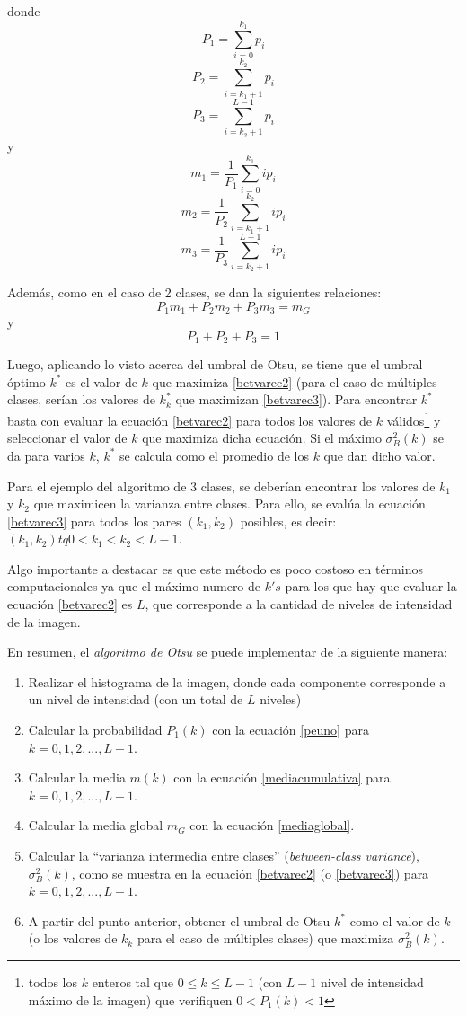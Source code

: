 donde $$P_1=\sum_{i=0}^{k_1}p_i$$ $$P_2=\sum_{i=k_1+1}^{k_2}p_i$$  $$P_3=\sum_{i=k_2+1}^{L-1}p_i$$ y $$m_1 = \frac{1}{P_1}\sum_{i=0}^{k_1}ip_i$$  $$m_2 = \frac{1}{P_2}\sum_{i=k_1+1}^{k_2}ip_i$$  $$m_3 = \frac{1}{P_3}\sum_{i=k_2+1}^{L-1}ip_i$$

Además, como en el caso de 2 clases, se dan la siguientes relaciones:
\begin{equation}
  P_1m_1 + P_2m_2 + P_3m_3 = m_G
\end{equation}
y
\begin{equation}
  P_1+P_2+P_3 = 1
\end{equation}

Luego, aplicando lo visto acerca del umbral de Otsu, se tiene que el umbral óptimo $k^*$ es el valor de $k$ que maximiza \ref{betvarec2} (para el caso de múltiples clases, serían los valores de $k_k^*$ que maximizan \ref{betvarec3}). Para encontrar $k^*$ basta con evaluar la ecuación \ref{betvarec2} para todos los valores de $k$ válidos\footnote{ todos los $k$ enteros tal que $0{\leq}k{\leq}L-1$ (con $L-1$ nivel de intensidad máximo de la imagen) que verifiquen $0<P_1(k)<1$ } y seleccionar el valor de $k$ que maximiza dicha ecuación. Si el máximo ${\sigma}_B^2(k)$ se da para varios $k$, $k^*$ se calcula como el promedio de los $k$ que dan dicho valor.

Para el ejemplo del algoritmo de 3 clases, se deberían encontrar los valores de $k_1$ y $k_2$ que maximicen la varianza entre clases. Para ello, se evalúa la ecuación \ref{betvarec3} para todos los pares $(k_1,k_2)$ posibles, es decir: $(k_1,k_2) tq 0<k_1<k_2<L-1$.

Algo importante a destacar es que este método es poco costoso en términos computacionales ya que el máximo numero de $k's$ para los que hay que evaluar la ecuación \ref{betvarec2} es $L$, que corresponde a la cantidad de niveles de intensidad de la imagen.

En resumen, el \textit{algoritmo de Otsu} se puede implementar de la siguiente manera:
\begin{enumerate}
 \item Realizar el histograma de la imagen, donde cada componente corresponde a un nivel de intensidad (con un total de $L$ niveles)
 \item Calcular la probabilidad $P_1(k)$ con la ecuación \ref{peuno} para $k=0,1,2,...,L-1$.
 \item Calcular la media $m(k)$ con la ecuación \ref{mediacumulativa} para $k=0,1,2,...,L-1$.
 \item Calcular la media global $m_G$ con la ecuación \ref{mediaglobal}.
 \item Calcular la ``varianza intermedia entre clases'' (\textit{between-class variance}), ${\sigma}_B^2(k)$, como se muestra en la ecuación \ref{betvarec2} (o \ref{betvarec3})  para $k=0,1,2,...,L-1$.
 \item A partir del punto anterior, obtener el umbral de Otsu $k^*$ como el valor de $k$ (o los valores de $k_k$ para el caso de múltiples clases) que maximiza ${\sigma}_B^2(k)$.
\end{enumerate}

